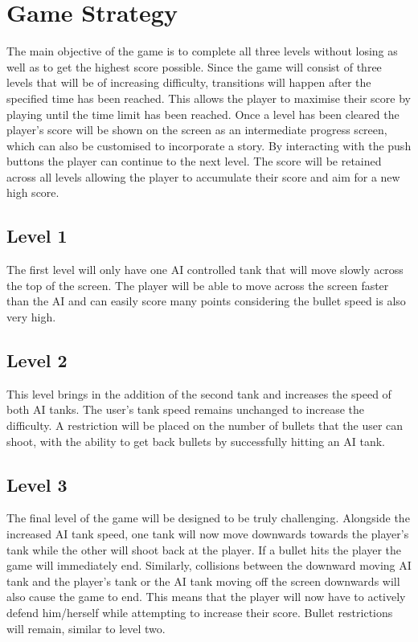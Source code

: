 \documentclass[a4paper,10pt,twoside]{article}
\begin{document}
\section{Game Strategy}

The main objective of the game is to complete all three levels without losing as well as to get the highest score possible. Since the game will consist of three levels that will be of increasing difficulty, transitions will happen after the specified time has been reached. This allows the player to maximise their score by playing until the time limit has been reached. Once a level has been cleared the player's score will be shown on the screen as an intermediate progress screen, which can also be customised to incorporate a story. By interacting with the push buttons the player can continue to the next level. The score will be retained across all levels allowing the player to accumulate their score and aim for a new high score.

\subsection{Level 1}

The first level will only have one AI controlled tank that will move slowly across the top of the screen. The player will be able to move across the screen faster than the AI and can easily score many points considering the bullet speed is also very high.

\subsection{Level 2}

This level brings in the addition of the second tank and increases the speed of both AI tanks. The user’s tank speed remains unchanged to increase the difficulty. A restriction will be placed on the number of bullets that the user can shoot, with the ability to get back bullets by successfully hitting an AI tank.

\subsection{Level 3}

The final level of the game will be designed to be truly challenging. Alongside the increased AI tank speed, one tank will now move downwards towards the player’s tank while the other will shoot back at the player. If a bullet hits the player the game will immediately end. Similarly, collisions between the downward moving AI tank and the player’s tank or the AI tank moving off the screen downwards will also cause the game to end. This means that the player will now have to actively defend him/herself while attempting to increase their score. Bullet restrictions will remain, similar to level two. 
\end{document}
